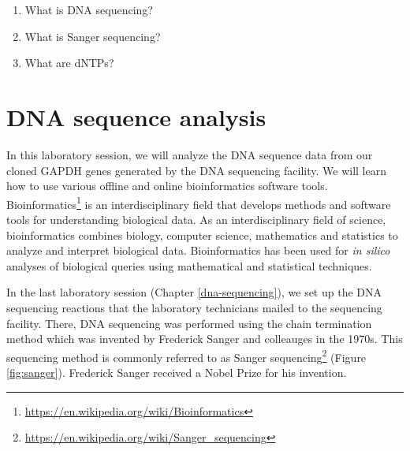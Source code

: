 \documentclass[]{book}
\providecommand{\tightlist}{%
  \setlength{\itemsep}{0pt}\setlength{\parskip}{0pt}}
\let\rmarkdownfootnote\footnote%
\def\footnote{\protect\rmarkdownfootnote}
\renewcommand{\href}[2]{#2\footnote{\url{#1}}}
\begin{document}
\begin{enumerate}
\def\labelenumi{\arabic{enumi}.}
\tightlist
\item
  What is DNA sequencing?
\item
  What is Sanger sequencing?
\item
  What are dNTPs?
\end{enumerate}

\hypertarget{dna-sequence-analysis}{%
\chapter{DNA sequence analysis}\label{dna-sequence-analysis}}

In this laboratory session, we will analyze the DNA sequence data from our cloned GAPDH genes generated by the DNA sequencing facility. We will learn how to use various offline and online bioinformatics software tools. \href{https://en.wikipedia.org/wiki/Bioinformatics}{Bioinformatics} is an interdisciplinary field that develops methods and software tools for understanding biological data. As an interdisciplinary field of science, bioinformatics combines biology, computer science, mathematics and statistics to analyze and interpret biological data. Bioinformatics has been used for \emph{in silico} analyses of biological queries using mathematical and statistical techniques.

In the last laboratory session (Chapter \ref{dna-sequencing}), we set up the DNA sequencing reactions that the laboratory technicians mailed to the sequencing facility. There, DNA sequencing was performed using the chain termination method which was invented by Frederick Sanger and colleauges in the 1970s. This sequencing method is commonly referred to as \href{https://en.wikipedia.org/wiki/Sanger_sequencing}{Sanger sequencing} (Figure \ref{fig:sanger}). Frederick Sanger received a Nobel Prize for his invention.
\end{document}
